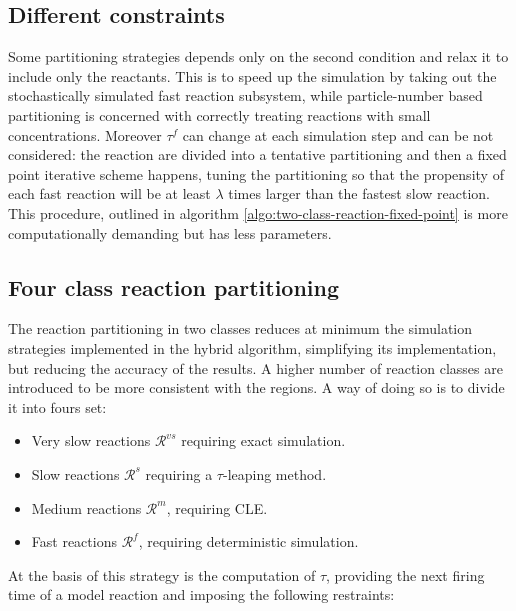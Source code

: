   \subsection{Different constraints}
  Some partitioning strategies depends only on the second condition and relax it to include only the reactants.
  This is to speed up the simulation by taking out the stochastically simulated fast reaction subsystem, while particle-number based partitioning is concerned with correctly treating reactions with small concentrations.
  Moreover $\tau^f$ can change at each simulation step and can be not considered: the reaction are divided into a tentative partitioning and then a fixed point iterative scheme happens, tuning the partitioning so that the propensity of each fast reaction will be at least $\lambda$ times larger than the fastest slow reaction.
  This procedure, outlined in algorithm \ref{algo:two-class-reaction-fixed-point} is more computationally demanding but has less parameters.

  

  \subsection{Four class reaction partitioning}
  The reaction partitioning in two classes reduces at minimum the simulation strategies implemented in the hybrid algorithm, simplifying its implementation, but reducing the accuracy of the results.
  A higher number of reaction classes are introduced to be more consistent with the regions.
  A way of doing so is to divide it into fours set:

  \begin{multicols}{2}
    \begin{itemize}
      \item Very slow reactions $\mathcal{R}^{vs}$ requiring exact simulation.
      \item Slow reactions $\mathcal{R}^s$ requiring a $\tau$-leaping method.
      \item Medium reactions $\mathcal{R}^m$, requiring CLE.
      \item Fast reactions $\mathcal{R}^f$, requiring deterministic simulation.
    \end{itemize}
  \end{multicols}

  At the basis of this strategy is the computation of $\tau$, providing the next firing time of a model reaction and imposing the following restraints:

